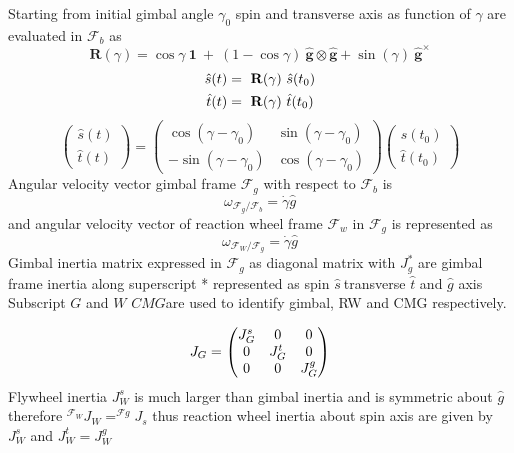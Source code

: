 Starting from initial gimbal angle $\displaystyle \gamma _{0}$ spin and transverse axis as function of $\displaystyle \gamma $ are evaluated in $\displaystyle \mathcal{F}_{b}$ as
\begin{equation}
\mathbf{R}( \gamma ) =\cos \gamma \ \mathbf{1} \ +\ ( 1-\cos \gamma ) \ \hat{\mathbf{g}} \otimes \hat{\mathbf{g}} +\sin( \gamma ) \ \hat{\mathbf{g}}^{\times }
\end{equation}
\begin{gather}
\hat{s}( t) =\ \mathbf{R}( \gamma ) \ \hat{s}( t_{0})\\
\hat{t}( t) =\ \mathbf{R}( \gamma ) \ \hat{t}( t_{0}) \notag
\end{gather}
\begin{equation}
\begin{pmatrix}
\hat{s}( t)\\
\hat{t}( t)
\end{pmatrix} =\begin{pmatrix}
\cos( \gamma -\gamma _{0}) & \sin( \gamma -\gamma _{0})\\
-\sin( \gamma -\gamma _{0}) & \cos( \gamma -\gamma _{0})
\end{pmatrix}\begin{pmatrix}
\hat{s}( t_{0})\\
\hat{t}( t_{0})
\end{pmatrix}
\end{equation}
Angular velocity vector gimbal frame $\displaystyle \mathcal{F}_{g}$ with respect to $\displaystyle \mathcal{F}_{b}$ is 
\begin{equation}
\omega _{\mathcal{F}_{g} /\mathcal{F}_{b}} =\dot{\gamma }\hat{g}
\end{equation}
and angular velocity vector of reaction wheel frame $\displaystyle \mathcal{F}_{w}$ in $\displaystyle \mathcal{F}_{g}$ is represented as
\begin{equation}
\omega _{\mathcal{F}_{W} /\mathcal{F}_{g}} =\dot{\gamma }\hat{g}
\end{equation}
Gimbal inertia matrix expressed in $\displaystyle \mathcal{F}_{g}$ as diagonal matrix with $\displaystyle J^{*}_{g}$ are gimbal frame inertia along superscript * represented as spin $\displaystyle \hat{s} \ $transverse $\displaystyle \hat{t}$ and $\displaystyle \hat{g}$ axis Subscript $G$ and $W$  $CMG$are used to identify gimbal, RW and CMG respectively.


\begin{gather}
J_{G} =\begin{pmatrix}
J^{s}_{G} & 0 & 0\\
0 & J^{t}_{G} & 0\\
0 & 0 & J^{g}_{G}
\end{pmatrix} \notag
\end{gather}
Flywheel inertia $\displaystyle J^s_{W}$ is much larger than gimbal inertia and is symmetric about $\displaystyle \hat{g}$ therefore $\displaystyle ^{\mathcal{F}_{W}} J_{W} =^{\mathcal{F} g} J_{s}$ thus reaction wheel inertia about spin axis are given by $\displaystyle J^{s}_{W}$ and $\displaystyle J^{t}_{W} =J^{g}_{W}$


